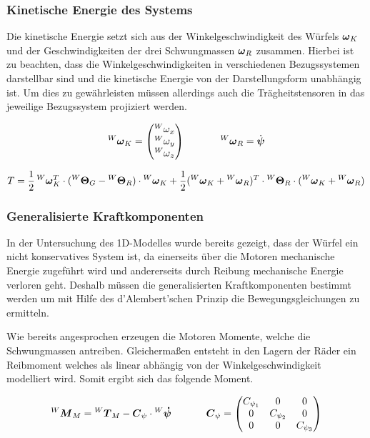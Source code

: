 \subsubsection{Kinetische Energie des Systems}
Die kinetische Energie setzt sich aus der Winkelgeschwindigkeit des Würfels $\boldsymbol{\omega}_K$ und der Geschwindigkeiten der drei Schwungmassen $\boldsymbol{\omega}_R$ zusammen. Hierbei ist zu beachten, dass die Winkelgeschwindigkeiten in verschiedenen Bezugssystemen darstellbar sind und die kinetische Energie von der Darstellungsform unabhängig ist. Um dies zu gewährleisten müssen allerdings auch die Trägheitstensoren in das jeweilige Bezugssystem projiziert werden.

\begin{equation}
\prescript{W}{}{}\boldsymbol{\omega}_K = \begin{pmatrix}
\prescript{W}{} \omega_x \\
\prescript{W}{} \omega_y \\
\prescript{W}{} \omega_z
\end{pmatrix}
\hspace{35pt}
\prescript{W}{}{}\boldsymbol{\omega}_R = \dot{\boldsymbol{\psi}}
\end{equation}

\begin{equation}
T = \frac{1}{2} \prescript{W}{}{}\boldsymbol{\omega}^T_K \cdot (\prescript{W}{}{}\boldsymbol{\Theta}_G - \prescript{W}{}{}\boldsymbol{\Theta}_R) \cdot \prescript{W}{}{}\boldsymbol{\omega}_K + \frac{1}{2} (\prescript{W}{}{}\boldsymbol{\omega}_K + \prescript{W}{}{}\boldsymbol{\omega}_R)^T \cdot \prescript{W}{}{}\boldsymbol{\Theta}_R \cdot (\prescript{W}{}{}\boldsymbol{\omega}_K + \prescript{W}{}{}\boldsymbol{\omega}_R)
\end{equation}

\subsubsection{Generalisierte Kraftkomponenten}
In der Untersuchung des 1D-Modelles wurde bereits gezeigt, dass der Würfel ein nicht konservatives System ist, da einerseits über die Motoren mechanische Energie zugeführt wird und andererseits durch Reibung mechanische Energie verloren geht. Deshalb müssen die generalisierten Kraftkomponenten bestimmt werden um mit Hilfe des d'Alembert'schen Prinzip die Bewegungsgleichungen zu ermitteln.
\newline

Wie bereits angesprochen erzeugen die Motoren Momente, welche die Schwungmassen antreiben. Gleichermaßen entsteht in den Lagern der Räder ein Reibmoment welches als linear abhängig von der Winkelgeschwindigkeit modelliert wird. Somit ergibt sich das folgende Moment.

\begin{equation}
\prescript{W}{}{}\boldsymbol{M}_M = \prescript{W}{}{}\boldsymbol{T}_M - \boldsymbol{C}_{\psi} \cdot \prescript{W}{}{}\boldsymbol{\dot {\psi}} \hspace{35pt} \boldsymbol{C}_{\psi} = \begin{pmatrix}
C_{\psi_1} & 0 & 0 \\
0 & C_{\psi_2} & 0 \\
0 & 0 & C_{\psi_3}
\end{pmatrix}
\end{equation}

